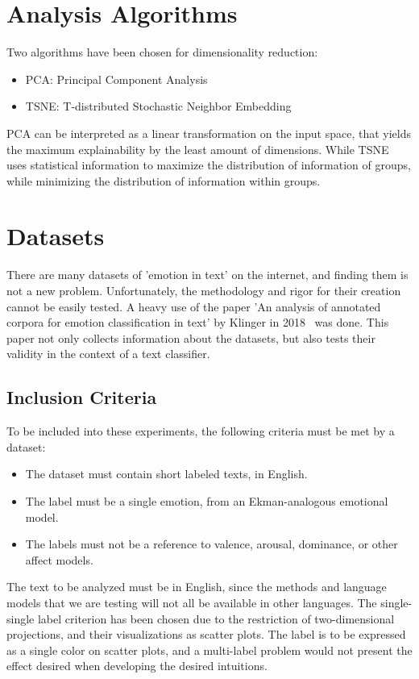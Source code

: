 \section{Analysis Algorithms}\label{sec:Analysis Algorithms}
Two algorithms have been chosen for dimensionality reduction:
\begin{itemize}
  \item PCA: Principal Component Analysis
  \item TSNE: T-distributed Stochastic Neighbor Embedding
\end{itemize}

PCA can be interpreted as a linear transformation on the input space, that yields the maximum explainability by the least amount of dimensions. While TSNE uses statistical information to maximize the distribution of information of groups, while minimizing the distribution of information within groups.

\section{Datasets}\label{sec:Datasets}
There are many datasets of 'emotion in text' on the internet, and finding them is not a new problem. Unfortunately, the methodology and rigor for their creation cannot be easily tested. A heavy use of the paper 'An analysis of annotated corpora for emotion classification in text' by Klinger in 2018~\cite{klinger2018analysis} was done. This paper not only collects information about the datasets, but also tests their validity in the context of a text classifier.

\subsection{Inclusion Criteria}\label{sub:Inclusion Criteria}
To be included into these experiments, the following criteria must be met by a dataset:
\begin{itemize}
  \item The dataset must contain short labeled texts, in English.
  \item The label must be a single emotion, from an Ekman-analogous emotional model.
  \item The labels must not be a reference to valence, arousal, dominance, or other affect models.
\end{itemize}
The text to be analyzed must be in English, since the methods and language models that we are testing will not all be available in other languages. The single-single label criterion has been chosen due to the restriction of two-dimensional projections, and their visualizations as scatter plots. The label is to be expressed as a single color on scatter plots, and a multi-label problem would not present the effect desired  when developing the desired intuitions.

